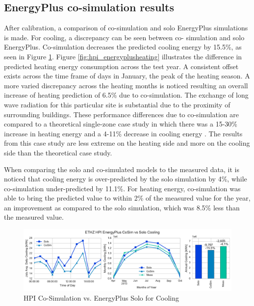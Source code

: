 \documentclass{tBPS2e}
\theoremstyle{plain}
\theoremstyle{definition}
\theoremstyle{remark}
\newcommand{\noteDT}[1]{\footnote{\textcolor{green}{#1}}}
\begin{document}
\subsection{EnergyPlus co-simulation results}
After calibration, a comparison of co-simulation and solo EnergyPlus
simulations is made. For cooling, a discrepancy can be seen between co-
simulation and solo EnergyPlus. Co-simulation decreases the predicted cooling energy by 15.5\%, as seen in Figure
\ref{fig:hpi_energypluscooling}. Figure \ref{fig:hpi_energyplusheating}
illustrates the difference in predicted heating energy consumption across the
test year. A consistent offset exists across the time frame of days in
January, the peak of the heating season. A more varied discrepancy across the
heating months is noticed resulting an overall increase of heating prediction
of 6.5\% due to co-simulation. The exchange of long wave radiation for this
particular site is substantial due to the proximity of surrounding buildings.
These performance differences due to co-simulation are compared to a
theoretical single-zone case study in which there was a 15-30\% increase in
heating energy and a 4-11\% decrease in cooling energy \citep{Miller:2015vk}.
The results from this case study are less extreme on the heating side and more
on the cooling side than the theoretical case study. 

When comparing the solo and co-simulated models to the measured data, it is noticed that 
cooling energy is over-predicted by the solo simulation by 4\%, while co-simulation under-predicted 
by 11.1\%. For heating energy, co-simulation was able to bring the predicted value to within 2\% of 
the measured value for the year, an improvement as compared to the solo simulation, which was 8.5\% less than the measured value.


\begin{figure}[H]
\centering
\includegraphics[scale=0.55]{figures/HPI_EnergyPlus_Cooling}
\caption{HPI Co-Simulation vs. EnergyPlus Solo for Cooling}
\label{fig:hpi_energypluscooling}
\end{figure}
\end{document}
